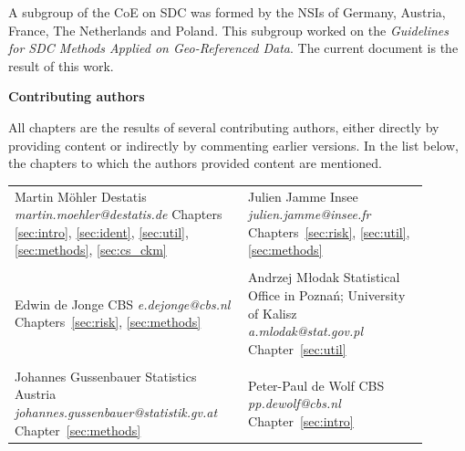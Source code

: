 \documentclass[openany,oneside]{book}
\begin{document}
A subgroup of the CoE on SDC was formed by the NSIs of Germany, Austria, France, The Netherlands and Poland. This subgroup worked on the \textit{Guidelines for SDC Methods Applied on Geo-Referenced Data}. The current document is the result of this work.

\maketitle

\thispagestyle{empty}

\noindent \textbf{\large Contributing authors}\bigskip

\noindent All chapters are the results of several contributing authors, either directly by providing content or indirectly by commenting earlier versions. In the list below, the chapters to which the authors provided content are mentioned.\bigskip\bigskip

\noindent
\begin{tabular}{p{0.5\linewidth}p{0.4\linewidth}}
Martin M\"{o}hler\newline
Destatis\newline
\textit{martin.moehler@destatis.de}\newline
Chapters~ \ref{sec:intro}, \ref{sec:ident}, \ref{sec:util}, \ref{sec:methods}, \ref{sec:cs_ckm}
&
Julien Jamme\newline
Insee\newline
\textit{julien.jamme@insee.fr}\newline
Chapters~\ref{sec:risk}, \ref{sec:util}, \ref{sec:methods}\\
&\\
Edwin de Jonge\newline
CBS\newline
\textit{e.dejonge@cbs.nl}\newline
Chapters~\ref{sec:risk}, \ref{sec:methods}
&
Andrzej M{\l}odak\newline
Statistical Office in Poznań; \newline
University of Kalisz\newline
\textit{a.mlodak@stat.gov.pl}\newline
Chapter~\ref{sec:util}\\
&\\
Johannes Gussenbauer\newline
Statistics Austria\newline
\textit{johannes.gussenbauer@statistik.gv.at}\newline
Chapter~\ref{sec:methods}
&
Peter-Paul de Wolf\newline
CBS\newline
\textit{pp.dewolf@cbs.nl}\newline
Chapter~\ref{sec:intro}\\
\end{tabular}\bigskip\bigskip
\end{document}
